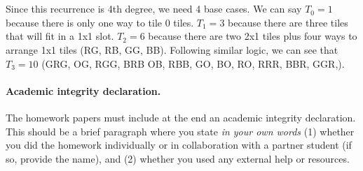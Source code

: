 \documentclass[11pt]{article}
\begin{document}
\begin{solution}
	\\\\ Since this recurrence is 4th degree, we need 4 base cases. We can say $T_0 = 1$ because there is only one way to tile 0 tiles. $T_1 = 3$ because there are three tiles that will fit in a 1x1 slot. $T_2 = 6$ because there are two 2x1 tiles plus four ways to arrange 1x1 tiles (RG, RB, GG, BB). Following similar logic, we can see that $T_3 = 10$ (GRG, OG, RGG, BRB OB, RBB, GO, BO, RO, RRR, BBR, GGR,).
\end{solution}

\newpage
\vskip 0.1in

\paragraph{Academic integrity declaration.}
The homework papers must include at the end an academic integrity declaration. This should be a brief paragraph where you state
\emph{in your own words}  (1) whether you did the homework individually or in collaboration with a partner student (if so, provide the name), 
and (2) whether you used any external help or resources. 
\end{document}
